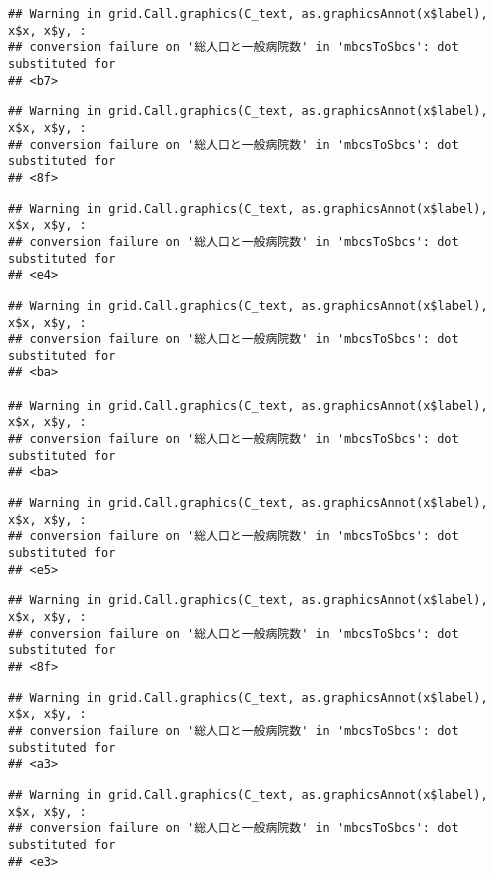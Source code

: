 \documentclass[
]{article}
\begin{document}
\begin{verbatim}
## Warning in grid.Call.graphics(C_text, as.graphicsAnnot(x$label), x$x, x$y, :
## conversion failure on '総人口と一般病院数' in 'mbcsToSbcs': dot substituted for
## <b7>
\end{verbatim}

\begin{verbatim}
## Warning in grid.Call.graphics(C_text, as.graphicsAnnot(x$label), x$x, x$y, :
## conversion failure on '総人口と一般病院数' in 'mbcsToSbcs': dot substituted for
## <8f>
\end{verbatim}

\begin{verbatim}
## Warning in grid.Call.graphics(C_text, as.graphicsAnnot(x$label), x$x, x$y, :
## conversion failure on '総人口と一般病院数' in 'mbcsToSbcs': dot substituted for
## <e4>
\end{verbatim}

\begin{verbatim}
## Warning in grid.Call.graphics(C_text, as.graphicsAnnot(x$label), x$x, x$y, :
## conversion failure on '総人口と一般病院数' in 'mbcsToSbcs': dot substituted for
## <ba>

## Warning in grid.Call.graphics(C_text, as.graphicsAnnot(x$label), x$x, x$y, :
## conversion failure on '総人口と一般病院数' in 'mbcsToSbcs': dot substituted for
## <ba>
\end{verbatim}

\begin{verbatim}
## Warning in grid.Call.graphics(C_text, as.graphicsAnnot(x$label), x$x, x$y, :
## conversion failure on '総人口と一般病院数' in 'mbcsToSbcs': dot substituted for
## <e5>
\end{verbatim}

\begin{verbatim}
## Warning in grid.Call.graphics(C_text, as.graphicsAnnot(x$label), x$x, x$y, :
## conversion failure on '総人口と一般病院数' in 'mbcsToSbcs': dot substituted for
## <8f>
\end{verbatim}

\begin{verbatim}
## Warning in grid.Call.graphics(C_text, as.graphicsAnnot(x$label), x$x, x$y, :
## conversion failure on '総人口と一般病院数' in 'mbcsToSbcs': dot substituted for
## <a3>
\end{verbatim}

\begin{verbatim}
## Warning in grid.Call.graphics(C_text, as.graphicsAnnot(x$label), x$x, x$y, :
## conversion failure on '総人口と一般病院数' in 'mbcsToSbcs': dot substituted for
## <e3>
\end{verbatim}
\end{document}
